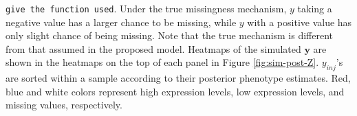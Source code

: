 \documentclass[12pt,]{article}
\def\beginmyfig{\begin{figure}[H]\center}
\def\endmyfig{\end{figure}}
\def\y{\bm{y}}
\newcommand{\true}{{\mbox{\tiny TR}}}
\def\beginmyfig{\begin{figure}[H]\center}
\def\endmyfig{\end{figure}}
\begin{document}
%
{\tt give the function used}.
%
Under the true missingness mechanism, $y$ taking a negative value has a larger chance to be missing, while $y$ with a positive value has only slight chance of being missing.  Note that the true mechanism is different from that assumed in the proposed model.   
Heatmaps of the simulated $\y$ are shown in the heatmaps on the top of each panel in Figure \ref{fig:sim-post-Z}. $y_{inj}$'s are sorted within a sample according to their posterior phenotype estimates.  Red, blue and white colors represent high expression levels, low expression levels, and missing values, respectively.



\end{document}
